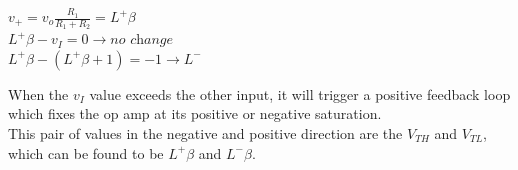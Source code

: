 \documentclass[11pt]{article}
\begin{document}
    \begin{center}
        $v_+ = v_o \frac{R_1}{R_1+R_2} = L^+\beta$ \\
        
        $L^+\beta - v_I = 0 \rightarrow \textit{no change}$     \\
        
        $L^+\beta - (L^+\beta + 1) = -1 \rightarrow L^-$ \\
        
    \end{center}

    When the $v_I$ value exceeds the other input, it will trigger a positive feedback loop which fixes the op amp at its positive or negative saturation. \\
    
    This pair of values in the negative and positive direction are the $V_{TH}$ and $V_{TL}$, which can be found to be $L^+\beta$ and $L^-\beta$.
    
\end{document}
